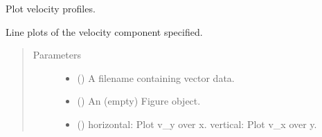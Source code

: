 \documentclass[letterpaper,10pt,english]{sphinxmanual}
\begin{document}
\begin{fulllineitems}
\label{\detokenize{vec_plot:openpivgui.vec_plot.profiles}}
Plot velocity profiles.

Line plots of the velocity component specified.
\begin{quote}\begin{description}
\item[{Parameters}] \leavevmode\begin{itemize}
\item {} 
 () \textendash{} A filename containing vector data.

\item {} 
 () \textendash{} An (empty) Figure object.

\item {} 
 () \textendash{} horizontal: Plot v\_y over x.
vertical: Plot v\_x over y.

\end{itemize}

\end{description}\end{quote}

\end{fulllineitems}

\end{document}
